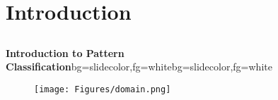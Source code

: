 

\section{Introduction}
\subsection{}
\begin{frame}{}
\begin{variableblock}{\centering \Large \textbf{\vspace{4pt}\newline Introduction to Pattern Classification\vspace{4pt}}}{bg=slidecolor,fg=white}{bg=slidecolor,fg=white}
\end{variableblock}
\begin{figure}
\centering
\texttt{[image: Figures/domain.png]}
\end{figure}
\end{frame}

